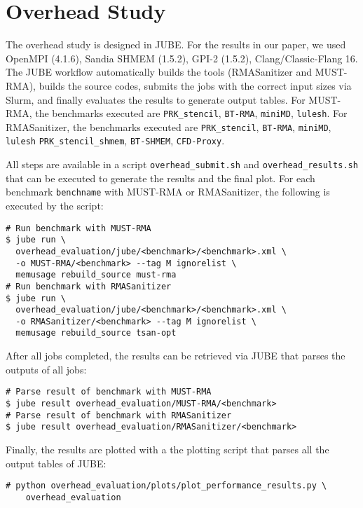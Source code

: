 \documentclass[twoside]{article}
\begin{document}
\section*{Overhead Study}
The overhead study is designed in JUBE.
For the results in our paper, we used OpenMPI (4.1.6), Sandia SHMEM (1.5.2), GPI-2 (1.5.2), Clang/Classic-Flang 16.
The JUBE workflow automatically builds the tools (RMASanitizer and MUST-RMA), builds the source codes, submits the jobs with the correct input sizes via Slurm, and finally evaluates the results to generate output tables.
For MUST-RMA, the benchmarks executed are \texttt{PRK\_stencil}, \texttt{BT-RMA}, \texttt{miniMD}, \texttt{lulesh}.
For RMASanitizer, the benchmarks executed are \texttt{PRK\_stencil}, \texttt{BT-RMA},  \texttt{miniMD}, \texttt{lulesh} \texttt{PRK\_stencil\_shmem}, \texttt{BT-SHMEM}, \texttt{CFD-Proxy}.

All steps are available in a script \texttt{overhead\_submit.sh} and \texttt{overhead\_results.sh} that can be executed to generate the results and the final plot.
For each benchmark \texttt{benchname} with MUST-RMA or RMASanitizer, the following is executed by the script:

{
\small
\begin{verbatim}
# Run benchmark with MUST-RMA
$ jube run \
  overhead_evaluation/jube/<benchmark>/<benchmark>.xml \
  -o MUST-RMA/<benchmark> --tag M ignorelist \ 
  memusage rebuild_source must-rma
# Run benchmark with RMASanitizer
$ jube run \
  overhead_evaluation/jube/<benchmark>/<benchmark>.xml \
  -o RMASanitizer/<benchmark> --tag M ignorelist \ 
  memusage rebuild_source tsan-opt
\end{verbatim}
}

After all jobs completed, the results can be retrieved via JUBE that parses the outputs of all jobs:

{
\small
\begin{verbatim}
# Parse result of benchmark with MUST-RMA
$ jube result overhead_evaluation/MUST-RMA/<benchmark>
# Parse result of benchmark with RMASanitizer
$ jube result overhead_evaluation/RMASanitizer/<benchmark>
\end{verbatim}
}

Finally, the results are plotted with a the plotting script that parses all the output tables of JUBE:
{
\footnotesize
\begin{verbatim}
# python overhead_evaluation/plots/plot_performance_results.py \
    overhead_evaluation
\end{verbatim}
}
\end{document}

